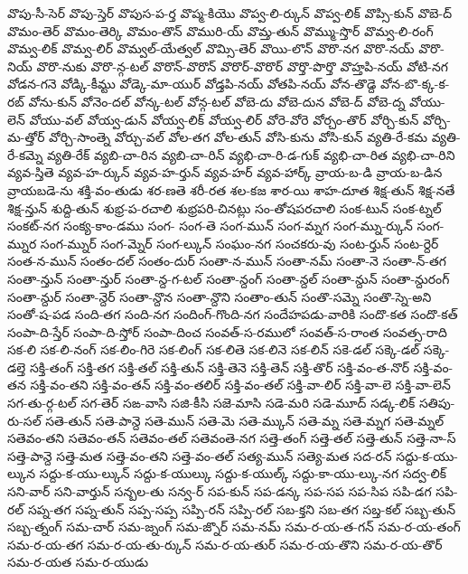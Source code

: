 {వొపు-సీ-సెర్
వొపు-స్తెర్
వొపుస-ప-ర్త
వొప్మ-కియొ
వొప్వ-లి-ర్కున్
వొప్వ-లిక్
వొప్సి-కున్
వొబె-ద్
వొమం-తెర్
వొమం-తెర్కి
వొమం-తొన్
వొమురి-య్
వొమ్త-తున్
వొమ్ము-స్తొర్
వొమ్వ-లి-రంగ్
వొమ్వ-లిక్
వొమ్వ-లిర్
వొమ్వల్-యేత్వల్
వొమ్సి-తెర్
వొయి-లొన్
వొరొ-నగ
వొరొ-నయ్
వొరొ-నియ్
వొరొ-నుకు
వొరొ-న్గ-టల్
వొరొన్-వొరొన్
వొరొర్-వొరొర్
వొర్తొ-పొర్తొ
వొహ్తపి-నయ్
వోటి-నగ
వోడన-గనె
వోడ్కి-కీమ్టు
వోడ్కె-మా-యుర్
వోడ్తపి-నయ్
వోతపి-నయ్
వోన-తొడ్దె
వోన-బొ-క్క-క-రబ్
వోను-కున్
వోనెం-దల్
వోన్క-టల్
వోన్గ-టల్
వోబె-దు
వోబె-దున
వోబె-ద్
వోబె-ద్న
వోయు-లెన్
వోయు-వల్
వోయ్వ-డున్
వోయ్వ-లిక్
వోయ్వ-లిర్
వోరె-వోరె
వోర్చం-తొర్
వోర్చి-కున్
వోర్చి-మ-త్తోర్
వోర్చి-సాంత్నె
వోర్చు-వల్
వోల-తగ
వోల-తున్
వోసి-కును
వోసి-కున్
వ్యతి-రే-కమ
వ్యతి-రే-కమ్నె
వ్యతి-రేక్
వ్యబి-చా-రిన
వ్యబి-చా-రిన్
వ్యభి-చా-రి-డ-గుక్
వ్యభి-చా-రిత
వ్యభి-చా-రిని
వ్యవ-స్తితె
వ్యవ-హ-ర్కున్
వ్యవ-హ-ర్తున్
వ్యవ-హర్
వ్యవ-హార్క్
వ్రాయ-బ-డి
వ్రాయ-బ-డిన
వ్రాయబడె-ను
శక్తి-వం-తుడు
శర-ణతె
శరీ-రత
శల-కజ
శార-యి
శాహ-దూత
శిక్ష-తున్
శిక్ష-నతే
శిక్ష-న్తున్
శుద్ది-తున్
శుభ్ర-ప-రచాలి
శుభ్రపరి-చినట్లు
సం-తోషపరచాలి
సంక-టున్
సంక-ట్నల్
సంకట్-నగ
సంక్య-కాం-డము
సంగ-
సంగ-తె
సంగ-మున్
సంగ-మ్నగ
సంగ-మ్ను-ర్కున్
సంగ-మ్నుర
సంగ-మ్నుర్
సంగ-మ్నెర్
సంగ-ల్కున్
సంఘం-నగ
సంచకరు-వు
సంట-ర్తున్
సంట-ర్దెర్
సంత-న-మున్
సంతం-దల్
సంతం-దుర్
సంతా-న-మున్
సంతా-నమ్
సంతా-నె
సంతా-న్-తగ
సంతా-న్తున్
సంతా-న్తుర్
సంతా-న్ద-గ-టల్
సంతా-న్దంగ్
సంతా-న్దల్
సంతా-న్దున్
సంతా-న్దురంగ్
సంతా-న్దుర్
సంతా-న్దెర్
సంతా-న్దొన
సంతా-న్దొని
సంతాం-తున్
సంతొ-సమ్నె
సంతొ-స్నె-అని
సంతో-ష-పడ
సంది-తగ
సంది-నగ
సందింగ్-గొంది-నగ
సందేహపడు-వారికి
సందొ-కత
సందొ-కత్
సంపా-ది-స్తేర్
సంపా-ది-స్తోర్
సంపా-దించ
సంవత్-స-రములో
సంవత్-స-రాంత
సంవత్స-రాది
సక-లి
సక-లి-నంగ్
సక-లిం-గిరె
సక-లింగ్
సక-లితె
సక-లినె
సక-లిన్
సకె-డల్
సక్కె-డల్
సక్కె-డల్తె
సక్తి-తంగ్
సక్తి-తగ
సక్తి-తల్
సక్తి-తున్
సక్తి-తెనె
సక్తి-తెన్
సక్తి-తొర్
సక్తి-వం-త-నొర్
సక్తి-వం-తన
సక్తి-వం-తని
సక్తి-వం-తన్
సక్తి-వం-తలిర్
సక్తి-వం-తల్
సక్తి-వా-లిర్
సక్తి-వా-లె
సక్తి-వా-లెన్
సగ-తు-ర్గ-టల్
సగ-తెర్
సఙ-వాసి
సజి-కీసి
సజె-మాసి
సడె-మరి
సడె-మూద్
సడ్క-లిక్
సతిపు-రు-సల్
సతె-తున్
సతె-పాన్దె
సతె-మున్
సతె-మె
సతె-మ్కున్
సతె-మ్న
సతె-మ్నగ
సతె-మ్నల్
సతెవం-తని
సతెవం-తన్
సతెవం-తల్
సతెవంతె-నగ
సత్తె-తంగ్
సత్తె-తల్
సత్తె-తున్
సత్తె-నా-స్
సత్తె-పాన్దె
సత్తె-మత
సత్తె-వం-తని
సత్తె-వం-తల్
సత్య-మున్
సత్యె-మత
సద-రన్
సద్దు-క-యు-ల్కున
సద్దు-క-యు-ల్కున్
సద్దు-క-యుల్కు
సద్దు-క-యుల్క్
సద్దు-కా-యు-ల్కు-నగ
సద్వ-లిక్
సని-వార్
సని-వార్తున్
సన్బల-తు
సన్వ-ర్
సప-కున్
సప-డన్క
సప-సప
సప-సిప
సపి-డగ
సపి-రల్
సప్న-తగ
సప్న-తున్
సప్ప-సప్ప
సప్పి-రన్
సప్పి-రల్
సబ-క్తని
సబ-తగ
సబ్త-కల్
సబ్బ-తున్
సబ్బ-త్నంగ్
సమ-చార్
సమ-జ్నంగ్
సమ-జ్నొర్
సమ-నమ్
సమ-ర-య-త-గన్
సమ-ర-య-తంగ్
సమ-ర-య-తగ
సమ-ర-య-తు-ర్కున్
సమ-ర-య-తుర్
సమ-ర-య-తొని
సమ-ర-య-తొర్
సమ-ర-యత
సమ-ర-యుడు
}
